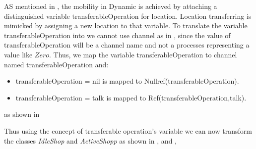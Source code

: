 AS mentioned in , the mobility in Dynamic \oz{} is achieved
by attaching a distinguished variable transferableOperation for location. Location transferring
is mimicked by assigning a new location to that variable. To translate the variable transferableOperation into \picalc{} we cannot use \picalc{} channel as in , since the value of transferableOperation will be a channel name and not a processes representing a value like $Zero$. Thus, we map the variable transferableOperation to channel named transferableOperation and:

\begin{itemize}
\item transferableOperation = nil is mapped to Nullref(transferableOperation).

\item transferableOperation = talk is mapped to Ref(transferableOperation,talk).
\end{itemize}
as shown in  

Thus using the concept of transferable operation's variable we can now transform the classes \textit{IdleShop} and \textit{ActiveShopp} as shown in ,  and , 



